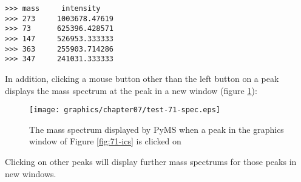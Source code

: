 \begin{verbatim}
>>> mass     intensity
>>> 273     1003678.47619
>>> 73      625396.428571
>>> 147     526953.333333
>>> 363     255903.714286
>>> 347     241031.333333
\end{verbatim}

In addition, clicking a mouse button other than the left button on a peak
displays the mass spectrum at the peak in a new window (figure \ref{fig:71-spec}):

\begin{figure}
  \begin{center}
    \texttt{[image: graphics/chapter07/test-71-spec.eps]}
  \end{center}
  \caption{The mass spectrum displayed by PyMS when a peak in the
  graphics window of Figure \ref{fig:71-ics} is clicked on}
  \label{fig:71-spec}
\end{figure}

Clicking on other peaks will display further mass spectrums for those peaks
in new windows.

